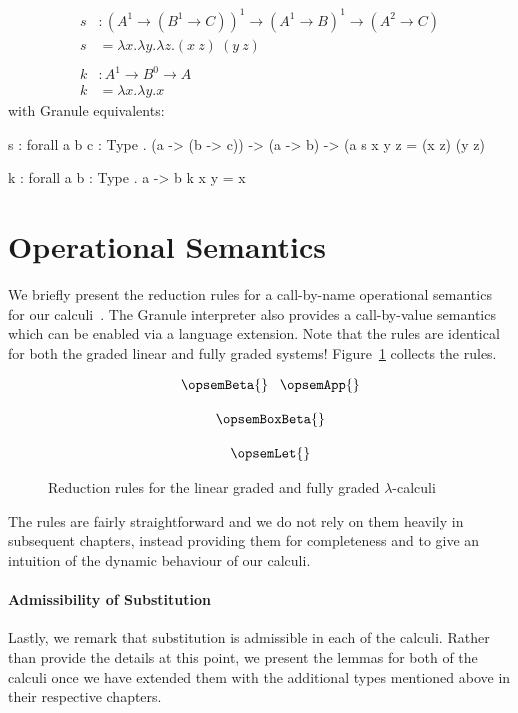 \begin{example}
\begin{align*}
s & : (A^1 \rightarrow (B^1 \rightarrow C))^1 \rightarrow (A^1 \rightarrow B)^1 \rightarrow (A^2 \rightarrow C) \\
s & = \lambda x . \lambda y . \lambda z . (x\ z)\ (y\ z)\\
\\
k & : A^1 \rightarrow B^0 \rightarrow A \\
k & = \lambda x . \lambda y . x 
\end{align*}
with Granule equivalents:
\begin{granule}
s : forall { a b c : Type } 
  . (a -> (b -> c)) -> (a -> b) -> (a %
s x y z = (x z) (y z)

k : forall { a b : Type } . a -> b %
k x y = x 
\end{granule}
\end{example}

\section{Operational Semantics}
\label{sec:op-sem}
We briefly present the reduction rules for a call-by-name operational semantics
for our calculi~\citep{tale-of-two-calculi}. The Granule interpreter also provides a
call-by-value semantics which can be enabled via a language extension. Note that
the rules are identical for both the graded linear and fully graded systems!
Figure~\ref{fig:opsem} collects the rules.
\begin{figure}[H]
\begin{align*}
\hspace{1.5em}
\begin{array}{c}
\opsemBeta{}
\;\;\;
\opsemApp{}
\\[1.25em]
\opsemBoxBeta{}
\\[1.25em]
\opsemLet{}
\end{array}
\end{align*}
\vspace{-0.5em}
\caption{Reduction rules for the linear graded and fully graded $\lambda$-calculi}
\label{fig:opsem}
\vspace{-0.5em}
 \end{figure}
 The rules are fairly straightforward and we do not rely on them heavily in
 subsequent chapters, instead providing them for completeness and to give an
 intuition of the dynamic behaviour of our calculi. 

\paragraph{Admissibility of Substitution}
\label{ref:substitution}
Lastly, we remark that substitution is admissible in each of the calculi. Rather
than provide the details at this point, we present the lemmas for
both of the calculi once we have extended them with the additional types
mentioned above in their respective chapters.

